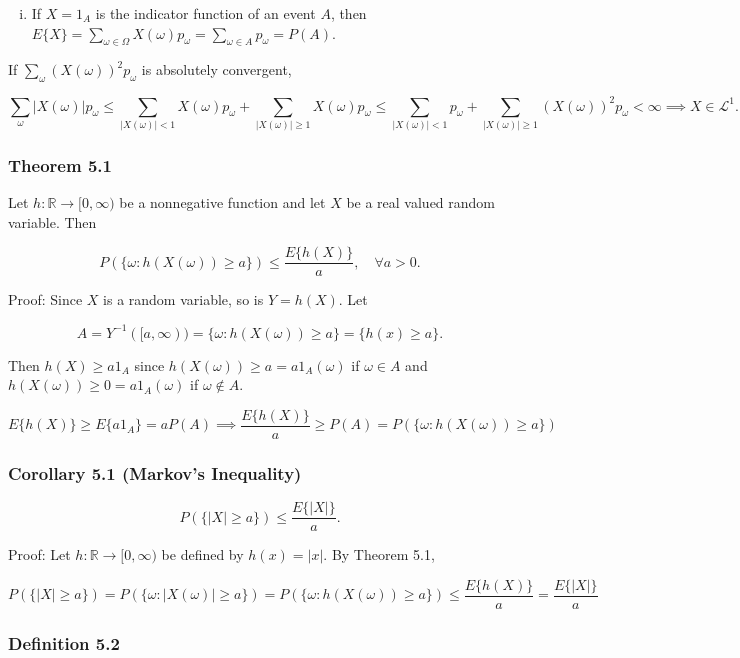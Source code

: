 \documentclass{article}
\begin{document}
{\begin{enumerate}[(i)]
\item If $X = 1_A$ is the indicator function of an event $A$, then $E\{X\} = \sum_{\omega \in \Omega} X(\omega)p_\omega = \sum_{\omega \in A} p_\omega = P(A)$.
\end{enumerate}

If $\sum_\omega (X(\omega))^2 p_\omega$ is absolutely convergent, 

$$
\sum_{\omega} |X(\omega)|p_\omega \leq \sum_{|X(\omega)| < 1} X(\omega) p_\omega + \sum_{|X(\omega)| \geq 1} X(\omega)p_\omega 
\leq \sum_{|X(\omega)| < 1} p_\omega + \sum_{|X(\omega)| \geq 1} (X(\omega))^2p_\omega < \infty \implies X \in \mathcal{L}^1.
$$

\subsubsection*{Theorem 5.1} Let $h: \mathbb{R}\rightarrow [0,\infty)$ be a nonnegative function and let $X$ be a real valued random variable. Then 

$$
P(\{\omega : h(X(\omega)) \geq a \}) \leq \frac{E\{h(X)\}}{a},
\quad \forall a > 0.
$$

Proof: Since $X$ is a random variable, so is $Y = h(X)$. Let

$$
A = Y^{-1}([a,\infty)) = \{\omega : h(X(\omega)) \geq a\} = \{h(x) \geq a\}. 
$$

Then $h(X) \geq a1_A$ since $h(X(\omega)) \geq a = a1_A(\omega)$ if $\omega \in A$ and $h(X(\omega)) \geq 0 = a1_A(\omega)$ if $\omega \notin A$. 

$$
E\{h(X)\} \geq E\{a1_A\} = aP(A) \implies \frac{E\{h(X)\}}{a} \geq P(A) = P(\{\omega : h(X(\omega)) \geq a\})
$$

\subsubsection*{Corollary 5.1 (Markov's Inequality)}

$$
P(\{|X| \geq a\}) \leq \frac{E\{|X|\}}{a}.
$$

Proof: Let $h: \mathbb{R}\rightarrow [0,\infty)$ be defined by $h(x) = |x|$. By Theorem 5.1,

$$
P(\{|X| \geq a\}) = P(\{\omega : |X(\omega)| \geq a\})
=P(\{\omega : h(X(\omega)) \geq a\}) \leq \frac{E\{h(X)\}}{a} = \frac{E\{|X|\}}{a}
$$

\subsubsection*{Definition 5.2}

}
\end{document}
